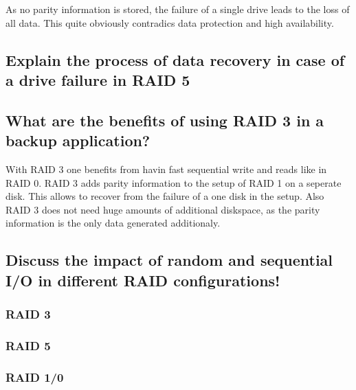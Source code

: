 \documentclass{article}
\begin{document}
	As no parity information is stored,
	the failure of a single drive leads to the loss of all data.
	This quite obviously contradics data protection and high availability.

\subsection{Explain the process of data recovery in case of a drive failure in RAID 5}

\subsection{What are the benefits of using RAID 3 in a backup application?}
	With RAID 3 one benefits from havin fast sequential write and reads like in RAID 0.
	RAID 3 adds parity information to the setup of RAID 1 on a seperate disk.
	This allows to recover from the failure of a one disk in the setup.
	Also RAID 3 does not need huge amounts of additional diskspace,
	as the parity information is the only data generated additionaly.

\subsection{Discuss the impact of random and sequential I/O in different RAID configurations!}
\subsubsection*{RAID 3}

\subsubsection*{RAID 5}

\subsubsection*{RAID 1/0}
\end{document}
